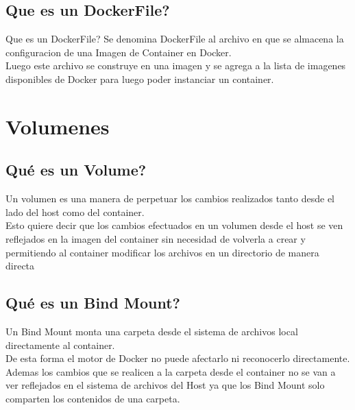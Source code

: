 \documentclass{beamer}
\begin{document}
\subsection{Que es un DockerFile?}
\begin{frame}{Que es un DockerFile?}
	Se denomina DockerFile al archivo en que se almacena la configuracion de una Imagen de Container en Docker. \\
	Luego este archivo se construye en una imagen y se agrega a la lista de imagenes disponibles de Docker para luego poder instanciar un container. \\
\end{frame}

\section{Volumenes}

\subsection{Qué es un Volume?}

\begin{frame}
	Un volumen es una manera de perpetuar los cambios realizados tanto desde el lado del host como del container.\\
	\vspace{.3cm}
	Esto quiere decir que los cambios efectuados en un volumen desde el host se ven reflejados en la imagen del container
	sin necesidad de volverla a crear y permitiendo al container modificar los archivos en un directorio de manera directa\\
\end{frame}

\subsection{Qué es un Bind Mount?}

\begin{frame}
	Un Bind Mount monta una carpeta desde el sistema de archivos local directamente al container. \\
	De esta forma el motor de Docker no puede afectarlo ni reconocerlo directamente. \\
	Ademas los cambios que se realicen a la carpeta desde el container no se van a ver reflejados en el sistema de archivos
	del Host ya que los Bind Mount solo comparten los contenidos de una carpeta. \\
\end{frame}
\end{document}
